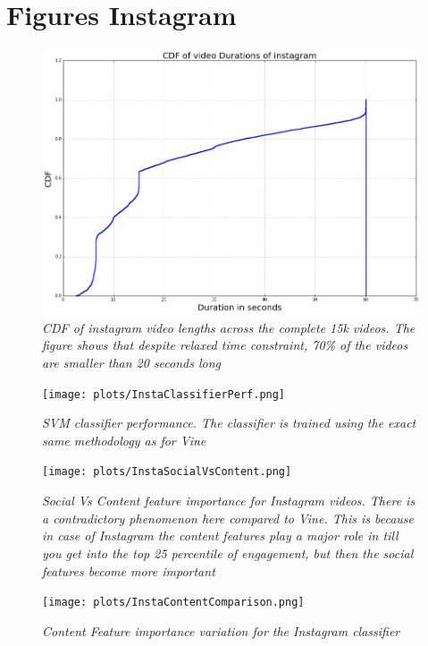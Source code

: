 \section{Figures Instagram}

\begin{figure}[!htb]
	\centering
	\includegraphics[width=\columnwidth]{plots/VideoDurationInsta.png}
	\caption{\textsl{CDF of instagram video lengths across the complete 15k videos. The figure shows that despite relaxed time constraint, 70\% of the videos are smaller than 20 seconds long}}
	\label{fig:Face_Thirds}
\end{figure}


\begin{figure}[!htb]
	\centering
	\texttt{[image: plots/InstaClassifierPerf.png]}
	\caption{\textsl{SVM classifier performance. The classifier is trained using the exact same methodology as for Vine}}
	\label{fig:Face_Thirds}
\end{figure}


\begin{figure}[!htb]
	\centering
	\texttt{[image: plots/InstaSocialVsContent.png]}
	\caption{\textsl{Social Vs Content feature importance for Instagram videos. There is a contradictory phenomenon here compared to Vine. This is because in case of Instagram the content features play a major role in till you get into the top 25 percentile of engagement, but then the social features become more important  }}
	\label{fig:Face_Thirds}
\end{figure}

\begin{figure}[!htb]
	\centering
	\texttt{[image: plots/InstaContentComparison.png]}
	\caption{\textsl{Content Feature importance variation for the Instagram classifier }}
	\label{fig:Face_Thirds}
\end{figure}

